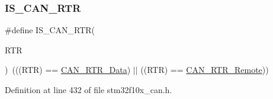 \subsubsection{\texorpdfstring{I\+S\+\_\+\+C\+A\+N\+\_\+\+R\+TR}{IS\_CAN\_RTR}}
{\footnotesize\ttfamily \#define I\+S\+\_\+\+C\+A\+N\+\_\+\+R\+TR(\begin{DoxyParamCaption}\item[{}]{R\+TR }\end{DoxyParamCaption})~(((R\+TR) == \hyperlink{group___c_a_n__remote__transmission__request_ga2407c3a8b2cd97bd651143aa959219f1}{C\+A\+N\+\_\+\+R\+T\+R\+\_\+\+Data}) $\vert$$\vert$ ((R\+TR) == \hyperlink{group___c_a_n__remote__transmission__request_ga42e95ddfb02d88c82de84058fb0fb349}{C\+A\+N\+\_\+\+R\+T\+R\+\_\+\+Remote}))}



Definition at line 432 of file stm32f10x\+\_\+can.\+h.

